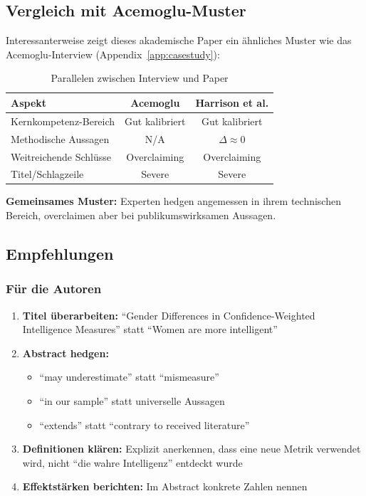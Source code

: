 \subsection{Vergleich mit Acemoglu-Muster}

Interessanterweise zeigt dieses akademische Paper ein \"ahnliches Muster wie das Acemoglu-Interview (Appendix~\ref{app:casestudy}):

\begin{table}[H]
\centering
\caption{Parallelen zwischen Interview und Paper}
\begin{tabular}{lcc}
\toprule
\textbf{Aspekt} & \textbf{Acemoglu} & \textbf{Harrison et al.} \\
\midrule
Kernkompetenz-Bereich & Gut kalibriert & Gut kalibriert \\
Methodische Aussagen & N/A & $\Delta \approx 0$ \\
Weitreichende Schl\"usse & Overclaiming & Overclaiming \\
Titel/Schlagzeile & Severe & Severe \\
\bottomrule
\end{tabular}
\end{table}

\textbf{Gemeinsames Muster:} Experten hedgen angemessen in ihrem technischen Bereich, overclaimen aber bei publikumswirksamen Aussagen.


\subsection{Empfehlungen}

\subsubsection{F\"ur die Autoren}

\begin{enumerate}
    \item \textbf{Titel \"uberarbeiten:} ``Gender Differences in Confidence-Weighted Intelligence Measures'' statt ``Women are more intelligent''
    \item \textbf{Abstract hedgen:}
    \begin{itemize}
        \item ``may underestimate'' statt ``mismeasure''
        \item ``in our sample'' statt universelle Aussagen
        \item ``extends'' statt ``contrary to received literature''
    \end{itemize}
    \item \textbf{Definitionen kl\"aren:} Explizit anerkennen, dass eine neue Metrik verwendet wird, nicht ``die wahre Intelligenz'' entdeckt wurde
    \item \textbf{Effektst\"arken berichten:} Im Abstract konkrete Zahlen nennen
\end{enumerate}

